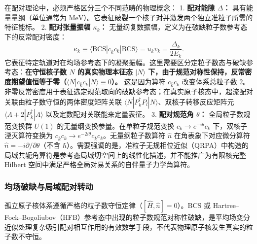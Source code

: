 在配对理论中，必须严格区分三个不同范畴的物理概念：
1. \textbf{配对能隙 $\Delta$：} 具有能量量纲（单位通常为 $\text{MeV}$）。它表征破裂一个核子对并激发两个独立准粒子所需的特征能标。
2. \textbf{配对张量振幅 $\kappa_k$：} 无量纲复数振幅，定义为在破缺粒子数参考态下的反常配对密度：
\begin{equation}\label{eq:2-3-27}
\kappa_k \equiv \langle\mathrm{BCS}| c_{\bar{k}} c_k |\mathrm{BCS}\rangle = u_k v_k = \frac{\Delta_k}{2 E_k}.
\end{equation}
   它表征特定轨道对在均场参考态下的凝聚振幅。这里需要区分定粒子数态与破缺参考态：\textbf{在守恒核子数 $N$ 的真实物理本征态 $|N\rangle$ 下，由于规范对称性保持，反常密度期望值恒等于零（$\langle N | c_{\bar{k}} c_k | N \rangle \equiv 0$）。} 这是因为算符 $c_{\bar{k}} c_k$ 改变体系总粒子数 2。非零反常密度用于表征选定规范取向的破缺参考态；在真实原子核态中，超流配对关联由粒子数守恒的两体密度矩阵关联 $\langle N | P_k^\dagger P_l | N \rangle$、双核子转移反应矩阵元 $\langle A+2 | P_k^\dagger | A \rangle$ 以及定数配对关联能来定量表征。
3. \textbf{配对规范角 $\theta$：} 全局粒子数规范变换群 $U(1)$ 的无量纲变换参量。在单粒子规范变换 $c_k \to e^{-i\theta} c_k$ 下，双核子湮灭算符变换为 $c_{\bar{k}} c_k \to e^{-2i\theta} c_{\bar{k}} c_k$。无量纲粒子数算符 $\hat{n}$ 在角表象下对应微分算符 $\hat{n} = -i \partial/\partial\theta$（不含 $\hbar$）。需要强调的是，准粒子无规相位近似（QRPA）中构造的局域共轭角算符是参考态局域切空间上的线性化描述，并不能推广为有限核完整 Hilbert 空间中满足严格全局对易关系的自伴量子力学角算符。


\subsubsection{均场破缺与局域配对转动}\label{sec:2-3-均场破缺与局域配对转动}


孤立原子核体系遵循严格的粒子数守恒定律（$[\hat{H}, \hat{n}] = 0$）。BCS 或 Hartree–Fock–Bogoliubov（HFB）参考态中出现的粒子数规范对称性破缺，是平均场变分近似处理复杂吸引配对相互作用的有效数学手段，不代表物理原子核发生真实的粒子数不守恒。

